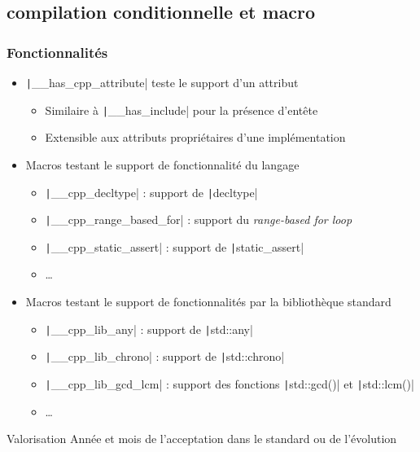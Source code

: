 \documentclass[C++.tex]{subfiles}
\begin{document}
\subsection*{compilation conditionnelle et macro}
\begin{frame}[fragile]
	\frametitle{Fonctionnalités}
	\begin{itemize}
		\item \texttt|__has_cpp_attribute| teste le support d'un attribut
		\begin{itemize}
			\item Similaire à \texttt|__has_include| pour la présence d'entête
			\item Extensible aux attributs propriétaires d'une implémentation
		\end{itemize}
		\item Macros testant le support de fonctionnalité du langage
		\begin{itemize}
			\item \texttt|__cpp_decltype| : support de \texttt|decltype|
			\item \texttt|__cpp_range_based_for| : support du \textit{range-based for loop}
			\item \texttt|__cpp_static_assert| : support de \texttt|static_assert|
			\item \ldots{}
		\end{itemize}
		\item Macros testant le support de fonctionnalités par la bibliothèque standard
		\begin{itemize}
			\item \texttt|__cpp_lib_any| : support de \texttt|std::any|
			\item \texttt|__cpp_lib_chrono| : support de \texttt|std::chrono|
			\item \texttt|__cpp_lib_gcd_lcm| : support des fonctions \texttt|std::gcd()| et \texttt|std::lcm()|
			\item \ldots{}
		\end{itemize}
	\end{itemize}

	\begin{block}{Valorisation}
		Année et mois de l'acceptation dans le standard ou de l'évolution

	\end{block}


\end{frame}
\end{document}
